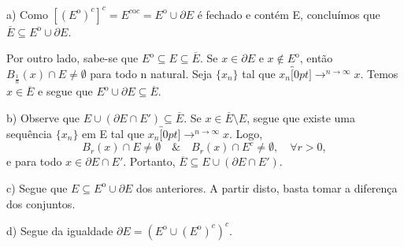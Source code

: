 \documentclass[MetricSpaces/metric_notes.tex]{subfiles}
\begin{document}
\begin{proof*}
	a) Como \([({E}^{\mathrm{o}})^{c}]^{c} = E^{c\mathrm{o}c}={E}^{\mathrm{o}}\cup \partial E\) é fechado
	e contém E, concluímos que \(\overline{E}\subseteq{{E}^{\mathrm{o}}}\cup \partial E\).

	Por outro lado, sabe-se que \({E}^{\mathrm{o}}\subseteq{E}\subseteq{\overline{E}}\). Se \(x\in \partial E\) e \(x\not\in {E}^{\mathrm{o}}\),
	então \(B_{\frac{1}{n}}(x)\cap E \neq\emptyset\) para todo n natural. Seja \(\{x_{n}\}\) tal que \(x_{n}\overbracket[0pt]{\longrightarrow}^{n\to\infty }x.\)
	Temos \(x\in \overline{E}\) e segue que \({E}^{\mathrm{o}}\cup \partial E \subseteq{\overline{E}}.\)

	b) Observe que \(E\cup(\partial E\cap E')\subseteq{\overline{E}}\). Se \(x\in\overline{E}\setminus{E}\), segue que
	existe uma sequência \(\{x_{n}\}\) em E tal que \(x_{n}\overbracket[0pt]{\longrightarrow}^{n\to \infty}x.\) Logo,
	\[
		B_{r}(x)\cap E \neq\emptyset\quad\&\quad B_{r}(x)\cap E^{c} \neq\emptyset,\quad \forall r>0,
	\]
	e para todo \(x\in \partial E\cap E'.\) Portanto, \(\overline{E}\subseteq{E\cup(\partial E\cap E')}.\)

	c) Segue que \(E\subseteq{{E}^{\mathrm{o}}\cup \partial E}\) dos anteriores. A partir disto, basta tomar
	a diferença dos conjuntos.

	d) Segue da igualdade \(\partial E = ({E}^{\mathrm{o}}\cup ({E}^{\mathrm{o}})^{c})^{c}\).
	\qedsymbol

\end{proof*}
\end{document}
